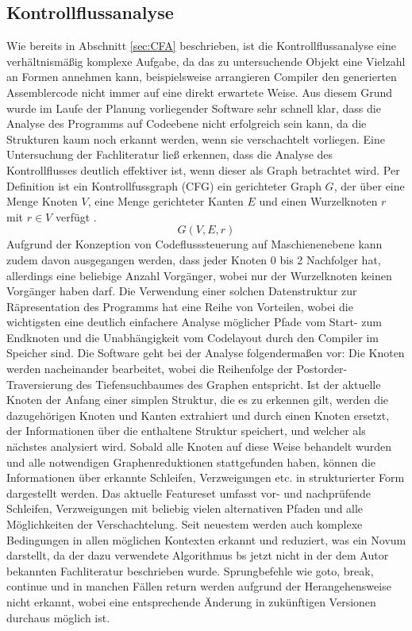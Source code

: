 \documentclass[11pt]{article}
\begin{document}
\subsection{Kontrollflussanalyse} Wie bereits in Abschnitt \ref{sec:CFA} beschrieben, ist die
Kontrollflussanalyse eine verhältnismäßig komplexe Aufgabe, da das zu untersuchende Objekt eine
Vielzahl an Formen annehmen kann, beispielsweise arrangieren Compiler den generierten Assemblercode
nicht immer auf eine direkt erwartete Weise. Aus diesem Grund wurde im Laufe der Planung
vorliegender Software sehr schnell klar, dass die Analyse des Programms auf Codeebene nicht
erfolgreich sein kann, da die Strukturen kaum noch erkannt werden, wenn sie verschachtelt vorliegen.
Eine Untersuchung der Fachliteratur ließ erkennen, dass die Analyse des Kontrollflusses deutlich
effektiver ist, wenn dieser als Graph betrachtet wird. Per Definition ist ein Kontrollfussgraph
(CFG) ein gerichteter Graph \(G\), der über eine Menge Knoten \(V\), eine Menge gerichteter Kanten
\(E\) und einen Wurzelknoten \(r\) mit \(r \in V\) verfügt \cite{wiki1:3}. \[G(V,E,r)\] Aufgrund der
Konzeption von Codeflusssteuerung auf Maschienenebene kann zudem davon ausgegangen werden, dass jeder
Knoten 0 bis 2 Nachfolger hat, allerdings eine beliebige Anzahl Vorgänger, wobei nur der
Wurzelknoten keinen Vorgänger haben darf. Die Verwendung einer solchen Datenstruktur zur
Räpresentation des Programms hat eine Reihe von Vorteilen, wobei die wichtigsten eine deutlich
einfachere Analyse möglicher Pfade vom Start- zum Endknoten und die Unabhängigkeit vom Codelayout
durch den Compiler im Speicher sind.  Die Software geht bei der Analyse folgendermaßen vor: Die
Knoten werden nacheinander bearbeitet, wobei die Reihenfolge der Postorder-Traversierung des
Tiefensuchbaumes des Graphen entspricht. Ist der aktuelle Knoten der Anfang einer simplen Struktur,
die es zu erkennen gilt, werden die dazugehörigen Knoten und Kanten extrahiert und durch einen
Knoten ersetzt, der Informationen über die enthaltene Struktur speichert, und welcher als nächstes
analysiert wird. Sobald alle Knoten auf diese Weise behandelt wurden und alle notwendigen
Graphenreduktionen stattgefunden haben, können die Informationen über erkannte Schleifen,
Verzweigungen etc. in strukturierter Form dargestellt werden. Das aktuelle Featureset umfasst vor-
und nachprüfende Schleifen, Verzweigungen mit beliebig vielen alternativen Pfaden und alle 
Möglichkeiten der Verschachtelung. Seit neuestem werden auch komplexe Bedingungen in allen
möglichen Kontexten erkannt und reduziert, was ein Novum darstellt, da der dazu verwendete
Algorithmus bs jetzt nicht in der dem Autor bekannten Fachliteratur beschrieben wurde. Sprungbefehle
wie goto, break, continue und in manchen Fällen return werden aufgrund der Herangehensweise nicht
erkannt, wobei eine entsprechende Änderung in zukünftigen Versionen durchaus möglich ist.
\end{document}
